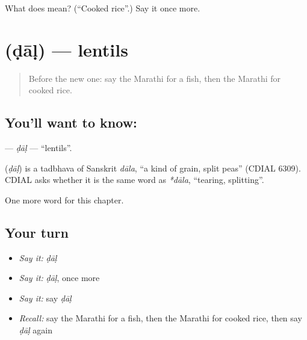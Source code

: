 \begin{tcolorbox}[breakable,colback=teal!4,colframe=teal!35!black,title={Before you move on}]
What does  mean? (\textquotedblleft{}Cooked rice\textquotedblright{}.) Say it once more.
\end{tcolorbox}
\section[\texorpdfstring{\mr{डाळ} (ḍāḷ)}{डाळ (ḍāḷ)}]{ (ḍāḷ) — lentils}

\label{lesson:MR-C85-dal}



\begin{quote}
Before the new one: say the Marathi for a fish, then the Marathi for cooked rice.
\end{quote}

\subsection*{You'll want to know: }
\textbf{} — \emph{ḍāḷ} — \textquotedblleft{}lentils\textquotedblright{}.

\begin{cousinweb}
\textbf{} (\emph{ḍāḷ}) is a tadbhava of Sanskrit \emph{dāla}, \textquotedblleft{}a kind of grain, split peas\textquotedblright{} (CDIAL 6309). CDIAL asks whether it is the same word as \emph{*dāla}, \textquotedblleft{}tearing, splitting\textquotedblright{}.
\end{cousinweb}

\begin{grammarlens}[title={What you've built}]
One more word for this chapter.
\end{grammarlens}

\subsection*{Your turn}
\begin{itemize}
\raggedright
  \item \emph{Say it:} \emph{ḍāḷ}
  \item \emph{Say it:} \emph{ḍāḷ}, once more
  \item \emph{Say it:} say \emph{ḍāḷ}
  \item \emph{Recall:} say the Marathi for a fish, then the Marathi for cooked rice, then say \emph{ḍāḷ} again
\end{itemize}


